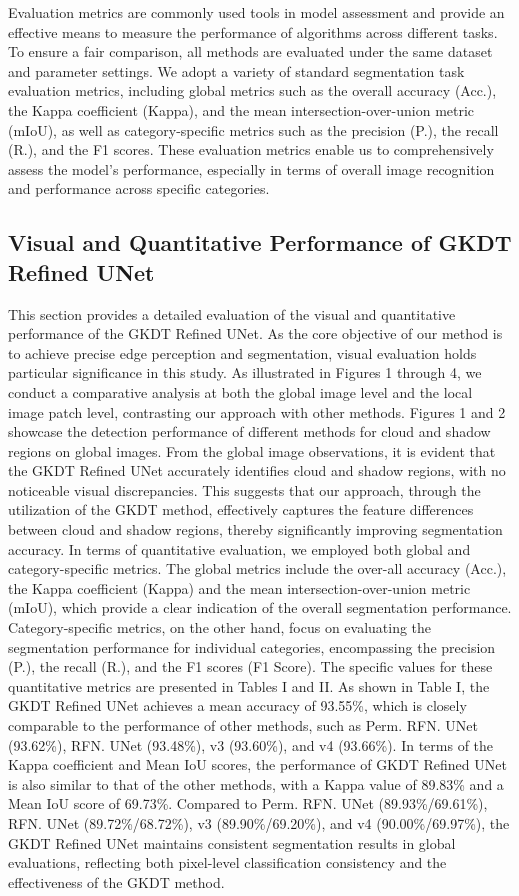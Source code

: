 \documentclass[journal]{IEEEtran}
\begin{document}
Evaluation metrics are commonly used tools in model assessment and provide an effective means to measure the performance of algorithms across different tasks. To ensure a fair comparison, all methods are evaluated under the same dataset and parameter settings. We adopt a variety of standard segmentation task evaluation metrics, including global metrics such as the overall accuracy (Acc.), the Kappa coefficient (Kappa), and the mean intersection-over-union metric (mIoU), as well as category-specific metrics such as the precision (P.), the recall (R.), and the F1 scores. These evaluation metrics enable us to comprehensively assess the model’s performance, especially in terms of overall image recognition and performance across specific categories.
\subsection{Visual and Quantitative Performance of GKDT Refined UNet}
\label{subsec:comparison}
This section provides a detailed evaluation of the visual and quantitative performance of the GKDT Refined UNet. As the core objective of our method is to achieve precise edge perception and segmentation, visual evaluation holds particular significance in this study. As illustrated in Figures 1 through 4, we conduct a comparative analysis at both the global image level and the local image patch level, contrasting our approach with other methods. Figures 1 and 2 showcase the detection performance of different methods for cloud and shadow regions on global images. From the global image observations, it is evident that the GKDT Refined UNet accurately identifies cloud and shadow regions, with no noticeable visual discrepancies. This suggests that our approach, through the utilization of the GKDT method, effectively captures the feature differences between cloud and shadow regions, thereby significantly improving segmentation accuracy.
In terms of quantitative evaluation, we employed both global and category-specific metrics. The global metrics include the over-all accuracy (Acc.), the Kappa coefficient (Kappa) and the mean intersection-over-union metric (mIoU), which provide a clear indication of the overall segmentation performance. Category-specific metrics, on the other hand, focus on evaluating the segmentation performance for individual categories, encompassing the precision (P.), the recall (R.), and the F1 scores (F1 Score). The specific values for these quantitative metrics are presented in Tables I and II.
As shown in Table I, the GKDT Refined UNet achieves a mean accuracy of 93.55\%, which is closely comparable to the performance of other methods, such as Perm. RFN. UNet (93.62\%), RFN. UNet (93.48\%), v3 (93.60\%), and v4 (93.66\%). In terms of the Kappa coefficient and Mean IoU scores, the performance of GKDT Refined UNet is also similar to that of the other methods, with a Kappa value of 89.83\% and a Mean IoU score of 69.73\%. Compared to Perm. RFN. UNet (89.93\%/69.61\%), RFN. UNet (89.72\%/68.72\%), v3 (89.90\%/69.20\%), and v4 (90.00\%/69.97\%), the GKDT Refined UNet maintains consistent segmentation results in global evaluations, reflecting both pixel-level classification consistency and the effectiveness of the GKDT method.
\end{document}
